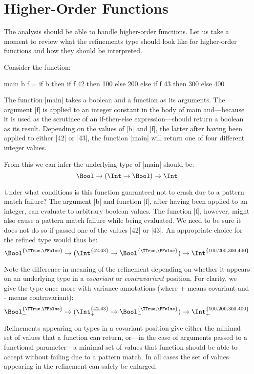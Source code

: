 \section{Higher-Order Functions}\label{sec31}

The analysis should be able to handle higher-order functions. Let us take a moment to review what the refinements type should look like for higher-order functions and how they should be interpreted. 

Consider the function:

\begin{code}
main b f =  if b then
                if  f 42  then  100  else  200
            else
                if  f 43  then  300  else  400
\end{code}

The function |main| takes a boolean and a function as its arguments. The argument |f| is applied to an integer constant in the body of main and---because it is used as the scrutinee of an if-then-else expression---should return a boolean as its result. Depending on the values of |b| and |f|, the latter after having been applied to either |42| or |43|, the function |main| will return one of four different integer values.

From this we can infer the underlying type of |main| should be: \[ \Bool \to (\Int \to \Bool) \to \Int \]

Under what conditions is this function guaranteed not to crash due to a pattern match failure? The argument |b| and function |f|, after having been applied to an integer, can evaluate to arbitrary boolean values. The function |f|, however, might also cause a pattern match failure while being evaluated. We need to be sure it does not do so if passed one of the values |42| or |43|. An appropriate choice for the refined type would thus be: \[ \Bool^{\{\TTrue, \FFalse\}} \to (\Int^{\{42, 43\}}\to\Bool^{\{\TTrue,\FFalse\}})\to \Int^{\{100,200,300,400\}}\]

Note the difference in meaning of the refinement depending on whether it appears on an underlying type in a \emph{covariant} or \emph{contravariant} position. For clarity, we give the type once more with variance annotations (where + means covariant and - means contravariant):
\[ \Bool^{\{\TTrue, \FFalse\}}_{-} \to (\Int^{\{42, 43\}}_{+}\to\Bool^{\{\TTrue,\FFalse\}}_{-})\to \Int^{\{100,200,300,400\}}_{+}\]

Refinements appearing on types in a covariant position give either the minimal set of values that a function can return, or---in the case of arguments passed to a functional parameter---a minimal set of values that function should be able to accept without failing due to a pattern match. In all cases the set of values appearing in the refinement can safely be enlarged.

